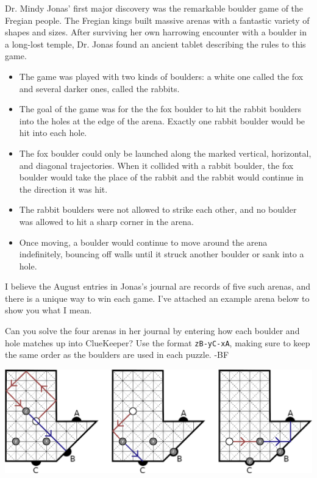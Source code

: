 Dr. Mindy Jonas' first major discovery was the remarkable boulder game of the Fregian people. 
The Fregian kings built massive arenas with a fantastic variety of shapes and sizes. 
After surviving her own harrowing encounter with a boulder in a long-lost temple, 
Dr. Jonas found an ancient tablet describing the rules to this game.

\begin{itemize}
\item The game was played with two kinds of boulders: a white one called the fox 
  and several darker ones, called the rabbits.
\item The goal of the game was for the the fox boulder to hit the rabbit boulders 
  into the holes at the edge of the arena. Exactly one rabbit boulder
  would be hit into each hole.
\item The fox boulder could only be launched along the marked vertical, horizontal, and 
  diagonal trajectories. When it collided with a rabbit boulder, the fox boulder would 
  take the place of the rabbit and the rabbit would continue in the direction it was hit.
\item The rabbit boulders were not allowed to strike each other, and no boulder was 
  allowed to hit a sharp corner in the arena.
\item Once moving, a boulder would continue to move around the arena indefinitely, 
  bouncing off walls until it struck another boulder or sank into a hole.
\end{itemize}

I believe the August entries in Jonas's journal are records of five such arenas, and
there is a unique way to win each game. I've attached an example arena below to show
you what I mean.

Can you solve the four arenas in her journal by entering how each boulder and
hole matches up into ClueKeeper? Use the format \texttt{zB-yC-xA}, making sure to
keep the same order as the boulders are used in each puzzle. -BF

\begin{center}
\includegraphics[width=\linewidth]{assets/Billiards_Puzzle_Tutorial.png}
\end{center}
